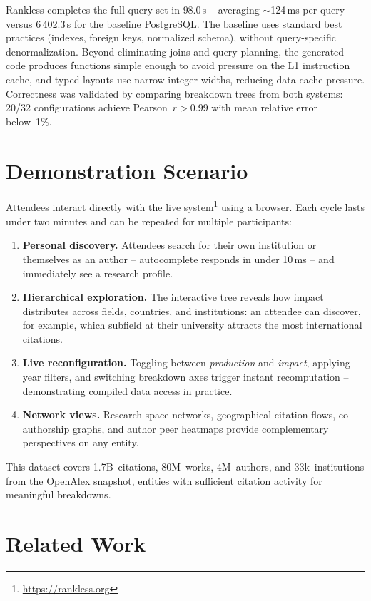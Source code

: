 \documentclass{article}
\newcommand{\evalConfigs}{32}
\newcommand{\evalTimeFlask}{6\,402.3}
\newcommand{\evalTimeRs}{98.0}
\newcommand{\evalHaN}{20}
\begin{document}
Rankless completes the full query set in \evalTimeRs{}\,s -- averaging ${\sim}$124\,ms per query -- versus \evalTimeFlask{}\,s for the baseline PostgreSQL. The baseline uses standard best practices (indexes, foreign keys, normalized schema), without query-specific denormalization.
Beyond eliminating joins and query planning, the generated code produces functions simple enough to avoid pressure on the L1 instruction cache, and typed layouts use narrow integer widths, reducing data cache pressure. Correctness was validated by comparing breakdown trees from both systems: \evalHaN{}/\evalConfigs{} configurations achieve Pearson~$r > 0.99$ with mean relative error below~1\%.

%
\section{Demonstration Scenario}
\label{sec:demo}

Attendees interact directly with the live system\footnote{\url{https://rankless.org}} using a browser. Each cycle lasts under two minutes and can be repeated for multiple participants:

\begin{enumerate}
\item \textbf{Personal discovery.} Attendees search for their own institution or themselves as an author -- autocomplete responds in under 10\,ms -- and immediately see a research profile.
\item \textbf{Hierarchical exploration.} The interactive tree reveals how impact distributes across fields, countries, and institutions: an attendee can discover, for example, which subfield at their university attracts the most international citations.
\item \textbf{Live reconfiguration.} Toggling between \emph{production} and \emph{impact}, applying year filters, and switching breakdown axes trigger instant recomputation -- demonstrating compiled data access in practice.
\item \textbf{Network views.} Research-space networks, geographical citation flows, co-authorship graphs, and author peer heatmaps provide complementary perspectives on any entity.
\end{enumerate}

This dataset covers 1.7B~citations, 80M~works, 4M~authors, and 33k~institutions from the OpenAlex snapshot, entities with sufficient citation activity for meaningful breakdowns.

%
\section{Related Work}
\label{sec:related}
\end{document}
